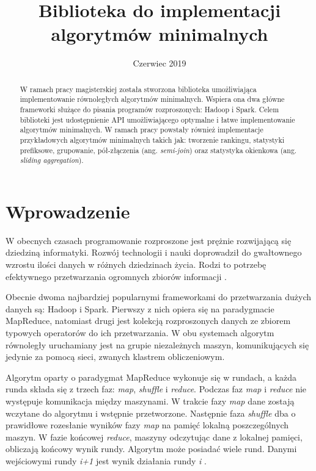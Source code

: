 \documentclass{pracamgr}
\title{Biblioteka do implementacji algorytmów minimalnych}
\date{Czerwiec 2019}
\begin{document}
\maketitle

\begin{abstract}
 W ramach pracy magisterskiej została stworzona biblioteka umożliwiająca implementowanie równoległych algorytmów minimalnych. Wspiera ona dwa główne frameworki służące do pisania programów rozproszonych: Hadoop i Spark. Celem biblioteki jest udostępnienie API umożliwiającego optymalne i łatwe implementowanie algorytmów minimalnych. W ramach pracy powstały również implementacje przykładowych algorytmów minimalnych takich jak: tworzenie rankingu, statystyki prefiksowe, grupowanie, pół-złączenia (ang. \textit{semi-join}) oraz statystyka okienkowa (ang. \textit{sliding aggregation}).
\end{abstract}

\tableofcontents

\chapter{Wprowadzenie}

W obecnych czasach programowanie rozproszone jest prężnie rozwijającą się dziedziną informatyki. Rozwój technologii i nauki doprowadził do gwałtownego wzrostu ilości danych w różnych dziedzinach życia. Rodzi to potrzebę efektywnego przetwarzania ogromnych zbiorów informacji \cite{watson2014tutorial, wu2013data}.

Obecnie dwoma najbardziej popularnymi frameworkami do przetwarzania dużych danych są: Hadoop i Spark. Pierwszy z nich opiera się na paradygmacie MapReduce, natomiast drugi jest kolekcją rozproszonych danych ze zbiorem typowych operatorów do ich przetwarzania. W obu systemach algorytm równoległy uruchamiany jest na grupie niezależnych maszyn, komunikujących się jedynie za pomocą sieci, zwanych klastrem obliczeniowym.

Algorytm oparty o paradygmat MapReduce wykonuje się w rundach, a każda runda składa się z trzech faz: \textit{map}, \textit{shuffle} i \textit{reduce}. Podczas faz \textit{map} i \textit{reduce} nie występuje komunikacja między maszynami. W trakcie fazy \textit{map} dane zostają wczytane do algorytmu i wstępnie przetworzone. Następnie faza \textit{shuffle} dba o prawidłowe rozesłanie wyników fazy \textit{map} na pamięć lokalną poszczególnych maszyn. W fazie końcowej \textit{reduce}, maszyny odczytując dane z lokalnej pamięci, obliczają końcowy wynik rundy. Algorytm może posiadać wiele rund. Danymi wejściowymi rundy \textit{i+1} jest wynik działania rundy \textit{i} \cite{white2012hadoop, taylor2010overview, shvachko2010hadoop}.
\end{document}
